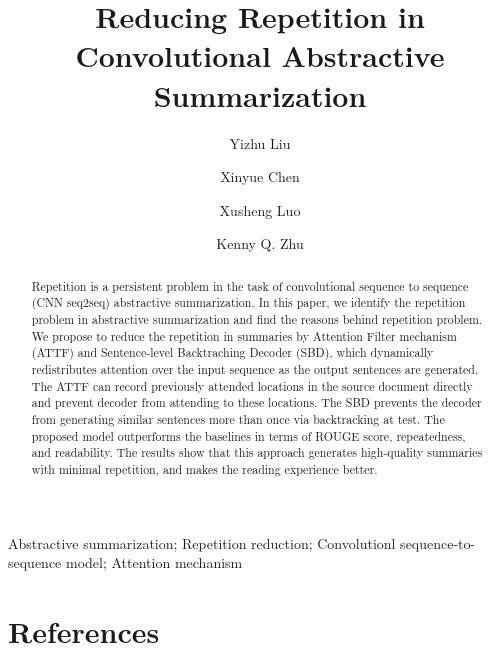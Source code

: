 \documentclass[review]{elsarticle}
\theoremstyle{definition}
\begin{document}
\begin{frontmatter}

\title{Reducing Repetition in Convolutional Abstractive Summarization}

\author[mymainaddress]{Yizhu Liu}
\author[mymainaddress]{Xinyue Chen} 
\author[mysecondaryaddress]{Xusheng Luo} 
\author[mymainaddress]{Kenny Q. Zhu}
\address[mymainaddress]{Department of Computer Science and Engineering, Shanghai Jiao Tong University, Shanghai, China}
\address[mysecondaryaddress]{Search and Recommendation Team, Alibaba Group,
Hangzhou, China}

\begin{abstract}
Repetition is a persistent problem in the task of 
convolutional sequence to sequence (CNN seq2seq) abstractive summarization. 
In this paper, we identify the repetition problem in abstractive summarization and find the reasons behind repetition problem.
We propose to reduce the repetition in summaries by 
Attention Filter mechanism (ATTF) and Sentence-level Backtraching Decoder (SBD),
which dynamically redistributes attention over the input sequence as the output sentences are generated. 
The ATTF can record previously attended locations in the source document directly and prevent decoder from attending to these locations. The SBD prevents the decoder from generating similar sentences more than once via backtracking at test.
The proposed model outperforms the baselines 
in terms of ROUGE score, repeatedness, and readability. 
The results show that this approach 
generates high-quality summaries with minimal repetition,
and makes the reading experience better.
\end{abstract}

\begin{keyword}
Abstractive summarization;
Repetition reduction;
Convolutionl sequence-to-sequence model; Attention mechanism 
\end{keyword}

\end{frontmatter}
\linenumbers






\section*{References}


\end{document}

